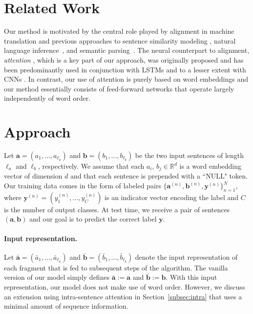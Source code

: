 \documentclass[11pt,letterpaper]{article}
\newcommand{\ab}{\mathbf{a}}
\newcommand{\bb}{\mathbf{b}}
\newcommand{\yb}{\mathbf{y}}
\newcommand{\RR}{\mathbb{R}}
\begin{document}
\vspace{-0.1cm}
\section{Related Work}
\vspace{-0.1cm}

Our method is motivated by the central role played by alignment in machine translation \cite{koehn2009statistical} and previous approaches to sentence similarity modeling \cite{haghighi2005robust,das2009paraphrase,chang2010discriminative,fader2013paraphrase}, natural language inference~\cite{marsi2005classification,maccartney2006learning,hickl2007discourse,maccartney2008phrase}, and semantic parsing~\cite{andreas2013semantic}.
The neural counterpart to alignment, \emph{attention} \cite{bahdanau2014neural}, which is a key part of our approach, was originally proposed and has been predominantly used in conjunction with LSTMs \cite{rocktaschel2015reasoning,wang2015learning} and to a lesser extent with CNNs \cite{yin2015abcnn}.
In contrast, our use of attention is purely based on word embeddings and our method essentially consists of feed-forward networks that operate largely independently of word order.

\vspace{-0.1cm}
\section{Approach}
\label{sec:approach}
\vspace{-0.1cm}

Let $\ab = (a_1,\ldots,a_{\ell_a})$ and $\bb = (b_1,\ldots,b_{\ell_b})$ be the two input sentences of length $\ell_a$ and $\ell_b$, respectively.
We assume that each $a_i$, $b_j \in \RR^d$ is a word embedding vector of dimension $d$ and that each sentence is prepended with a ``NULL" token. Our training data comes in the form of labeled pairs $\{\ab^{(n)}, \bb^{(n)}, \yb^{(n)} \}_{n=1}^N$, where $\yb^{(n)} = (y_1^{(n)},\ldots,y_C^{(n)})$ is an indicator vector encoding the label and $C$ is the number of output classes.
At test time, we receive a pair of sentences $(\ab, \bb)$ and our goal is to predict the correct label $\yb$.


\paragraph{Input representation.} Let $\bar{\ab} = (\bar{a}_1,\ldots,\bar{a}_{\ell_a})$ and $\bar{\bb} = (\bar{b}_1,\ldots, \bar{b}_{\ell_b})$ denote the input representation of each fragment that is fed to subsequent steps of the algorithm. The vanilla version of our model simply defines $\bar{\ab} := \ab$ and $\bar{\bb} := \bb$. With this input representation, our model does not make use of word order.
However, we discuss an extension using intra-sentence attention in Section~\ref{subsec:intra} that uses a minimal amount of sequence information.
\end{document}
